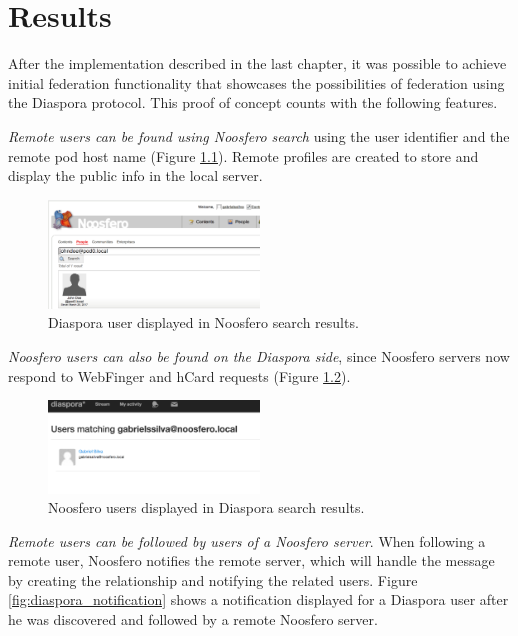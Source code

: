 \chapter{Results}
\label{chapter:6}

After the implementation described in the last chapter, it was possible
to achieve initial federation functionality that showcases the
possibilities of federation using the Diaspora protocol. This proof of
concept counts with the following features.

\textit{Remote users can be found using Noosfero search} using the user
identifier and the remote pod host name (Figure
\ref{fig:noosfero_search}). Remote profiles are created to store and
display the public info in the local server.

\begin{figure}[hbt]
  \centering
  \includegraphics[width=0.5\textwidth]{figures/noosfero_search.eps}
  \caption{Diaspora user displayed in Noosfero search results.}
  \label{fig:noosfero_search}
\end{figure}

\textit{Noosfero users can also be found on the Diaspora side}, since Noosfero
servers now respond to WebFinger and hCard requests (Figure
\ref{fig:diaspora_search}).

\begin{figure}[hbt]
  \centering
    \includegraphics[width=0.5\textwidth]{figures/diaspora_search.eps}
  \caption{Noosfero users displayed in Diaspora search results.}
  \label{fig:diaspora_search}
\end{figure}

\textit{Remote users can be followed by users of a Noosfero server}. When
following a remote user, Noosfero notifies the remote server, which will
handle the message by creating the relationship and notifying the
related users. Figure \ref{fig:diaspora_notification} shows a
notification displayed for a Diaspora user after he was discovered and
followed by a remote Noosfero server.

